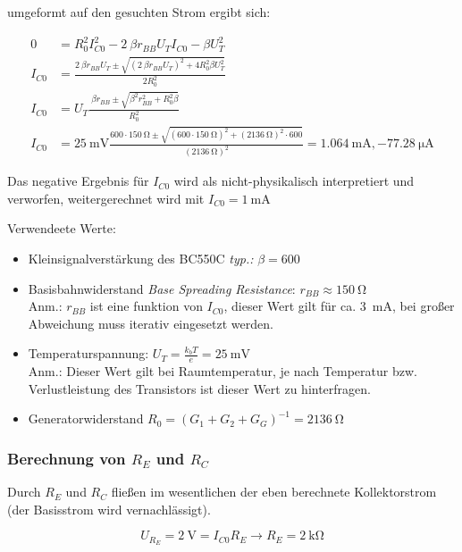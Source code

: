 umgeformt auf den gesuchten Strom ergibt sich:

\begin{align*}
    0 &= R_0^2 I_{C0}^2 - 2 \ \beta  r_{BB}  U_T  I_{C0} - \beta U_{T}^2 \\
    I_{C0} &= \frac{2 \ \beta  r_{BB}  U_T \pm \sqrt{\left( 2 \ \beta  r_{BB}  U_T\right)^2 + 4  R_{0}^2 \beta U_{T}^2 }}{2 R_{0}^2} \\
    I_{C0} &= U_T \frac{ \ \beta  r_{BB} \pm \sqrt{ \beta^2  r_{BB}^2 +  R_{0}^2 \beta }}{ R_{0}^2} \\
    I_{C0} &= \SI{25}{\milli \volt} \frac{600 \cdot \SI{150}{\ohm} \pm \sqrt{(600 \cdot \SI{150}{\ohm})^2 + (\SI{2136}{\ohm})^2 \cdot 600}}{(\SI{2136}{\ohm})^2} = \SI{1.064}{\milli \ampere}, \SI{-77.28}{\micro \ampere}
\end{align*}

Das negative Ergebnis für $I_{C0}$ wird als nicht-physikalisch interpretiert und verworfen, weitergerechnet wird mit $I_{C0} = \SI{1}{\milli \ampere}$

Verwendeete Werte:

\begin{itemize}
    \item Kleinsignalverstärkung des BC550C \emph{typ.: }$\beta = 600$
    \item Basisbahnwiderstand \emph{Base Spreading Resistance}: $r_{BB} \approx \SI{150}{\ohm}$ \\
    Anm.: $r_{BB}$ ist eine funktion von $I_{C0}$, dieser Wert gilt für ca. \SI{3}{\milli\ampere}, bei großer Abweichung muss iterativ eingesetzt werden.
    \item Temperaturspannung: $U_T = \frac{k_b T}{e} = \SI{25}{\milli \volt}$ \\
    Anm.: Dieser Wert gilt bei Raumtemperatur, je nach Temperatur bzw. Verlustleistung des Transistors ist dieser Wert zu hinterfragen.
    \item Generatorwiderstand $R_0 = \left( G_1 + G_2 + G_G\right)^{-1} = \SI{2136}{\ohm}$
\end{itemize}

\subsubsection{Berechnung von $R_E$ und $R_C$}

Durch $R_E$ und $R_C$ fließen im wesentlichen der eben berechnete Kollektorstrom (der Basisstrom wird vernachlässigt).

\begin{equation*}
    U_{R_{E}} = \SI{2}{\volt} = I_{C0} R_E \rightarrow R_E = \SI{2}{\kilo \ohm}
\end{equation*}

